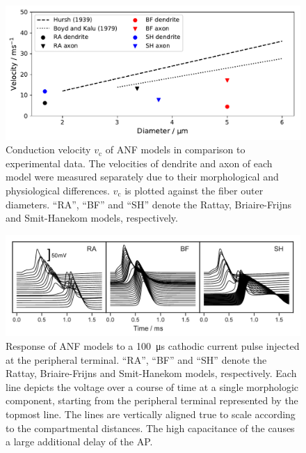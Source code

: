 \documentclass[utf8]{frontiersSCNS} %
\newcommand{\T}[1]{\text{#1}}
\begin{document}
\begin{figure}[h!]
\begin{center}
\includegraphics[width=\linewidth]{images/conduction_velocity_plot.pdf}
\end{center}
\caption{Conduction velocity $v_{\T{c}}$ of ANF models in comparison to experimental data. The velocities of dendrite and axon of each model were measured separately due to their morphological and physiological differences. $v_{\T{c}}$ is plotted against the fiber outer diameters. ``RA'', ``BF'' and ``SH'' denote the Rattay, Briaire-Frijns and Smit-Hanekom models, respectively.}
\label{fig:conduction_velocity_plot}
\end{figure}

\begin{figure}[h!]
\begin{center}
\includegraphics[width=\linewidth]{images/voltage_course_comparison_plot.pdf}
\end{center}
\caption{Response of ANF models to a \SI{100}{\micro\second} cathodic current pulse injected at the peripheral terminal. ``RA'', ``BF'' and ``SH'' denote the Rattay, Briaire-Frijns and Smit-Hanekom models, respectively. Each line depicts the voltage over a course of time at a single morphologic component, starting from the peripheral terminal represented by the topmost line. %
The lines are vertically aligned true to scale according to the compartmental distances.
The high capacitance of the causes a large additional delay of the AP.}
\label{fig:somatic_delay}
\end{figure}
\end{document}
